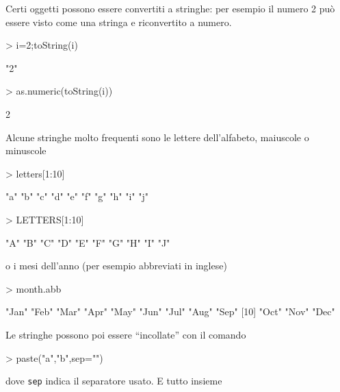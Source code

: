 \documentclass[onecolumn,11pt]{book}
\begin{document}
Certi oggetti possono essere convertiti a stringhe: per esempio il numero 2 pu\`o essere visto come una stringa e riconvertito a numero.
\begin{Schunk}
\begin{Sinput}
>  i=2;toString(i) 
\end{Sinput}
\begin{Soutput}
[1] "2"
\end{Soutput}
\begin{Sinput}
> as.numeric(toString(i))
\end{Sinput}
\begin{Soutput}
[1] 2
\end{Soutput}
\end{Schunk}
Alcune stringhe molto frequenti sono le lettere  dell'alfabeto, maiuscole o minuscole
\begin{Schunk}
\begin{Sinput}
> letters[1:10]
\end{Sinput}
\begin{Soutput}
 [1] "a" "b" "c" "d" "e" "f" "g" "h" "i" "j"
\end{Soutput}
\begin{Sinput}
> LETTERS[1:10]
\end{Sinput}
\begin{Soutput}
 [1] "A" "B" "C" "D" "E" "F" "G" "H" "I" "J"
\end{Soutput}
\end{Schunk}
o i mesi dell'anno (per esempio abbreviati in inglese)
\begin{Schunk}
\begin{Sinput}
> month.abb 
\end{Sinput}
\begin{Soutput}
 [1] "Jan" "Feb" "Mar" "Apr" "May" "Jun" "Jul" "Aug" "Sep"
[10] "Oct" "Nov" "Dec"
\end{Soutput}
\end{Schunk}
Le stringhe possono poi essere ``incollate'' con il comando 
\begin{Schunk}
\begin{Sinput}
> paste("a","b",sep="")
\end{Sinput}
\end{Schunk}
dove \texttt{sep}  indica il separatore usato.
E tutto insieme
\end{document}
